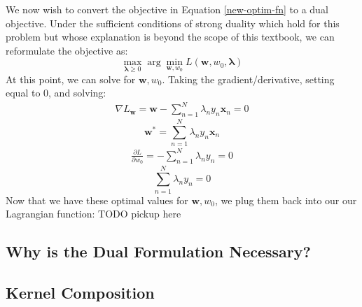
We now wish to convert the objective in Equation \ref{new-optim-fn} to a dual objective. Under the sufficient conditions of strong duality which hold for this problem but whose explanation is beyond the scope of this textbook, we can reformulate the objective as:
\begin{equation} \label{dual-objective}
	\max_{\boldsymbol{\lambda} \geq 0} \arg\min_{\textbf{w}, w_{0}} L(\textbf{w}, w_{0}, \boldsymbol{\lambda})
\end{equation}
At this point, we can solve for $\textbf{w}, w_{0}$. Taking the gradient/derivative, setting equal to 0, and solving:
\begin{align*}
	\nabla L_{\textbf{w}} = \textbf{w} - \sum_{n=1}^{N} \lambda_{n} y_{n} \textbf{x}_{n} = 0
\end{align*}
\begin{equation} \label{solve-for-w}
	\textbf{w}^{*} = \sum_{n=1}^{N} \lambda_{n} y_{n} \textbf{x}_{n}
\end{equation}
\begin{align*}
	\frac{\partial L}{\partial w_{0}} = - \sum_{n=1}^{N} \lambda_{n} y_{n} = 0
\end{align*}
\begin{equation} \label{solve-for-w0}
	\sum_{n=1}^{N} \lambda_{n} y_{n} = 0
\end{equation}
Now that we have these optimal values for $\textbf{w}, w_{0}$, we plug them back into our our Lagrangian function: TODO pickup here

\subsection{Why is the Dual Formulation Necessary?}
\subsection{Kernel Composition}
